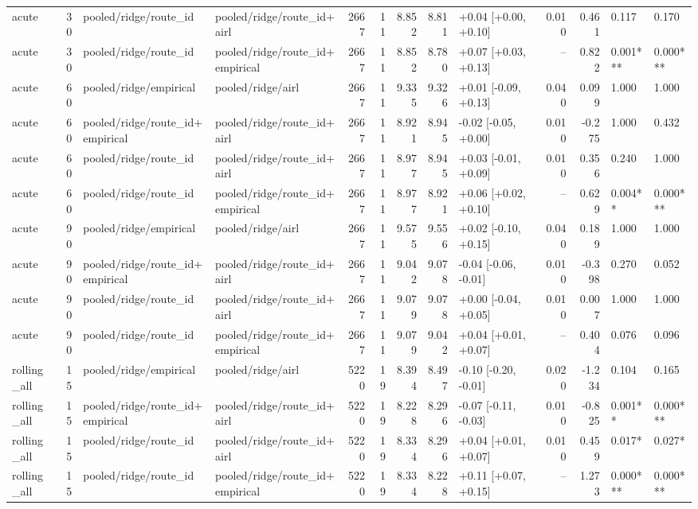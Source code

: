 \begin{tabular}{lrllrrrrlrrll}
acute & 30 & pooled/ridge/route_id & pooled/ridge/route_id+airl & 2667 & 11 & 8.852 & 8.811 & +0.04 [+0.00, +0.10] & 0.010 & 0.461 & 0.117 & 0.170 \\
acute & 30 & pooled/ridge/route_id & pooled/ridge/route_id+empirical & 2667 & 11 & 8.852 & 8.780 & +0.07 [+0.03, +0.13] & -- & 0.822 & 0.001*** & 0.000*** \\
acute & 60 & pooled/ridge/empirical & pooled/ridge/airl & 2667 & 11 & 9.335 & 9.326 & +0.01 [-0.09, +0.13] & 0.040 & 0.099 & 1.000 & 1.000 \\
acute & 60 & pooled/ridge/route_id+empirical & pooled/ridge/route_id+airl & 2667 & 11 & 8.921 & 8.945 & -0.02 [-0.05, +0.00] & 0.010 & -0.275 & 1.000 & 0.432 \\
acute & 60 & pooled/ridge/route_id & pooled/ridge/route_id+airl & 2667 & 11 & 8.977 & 8.945 & +0.03 [-0.01, +0.09] & 0.010 & 0.356 & 0.240 & 1.000 \\
acute & 60 & pooled/ridge/route_id & pooled/ridge/route_id+empirical & 2667 & 11 & 8.977 & 8.921 & +0.06 [+0.02, +0.10] & -- & 0.629 & 0.004** & 0.000*** \\
acute & 90 & pooled/ridge/empirical & pooled/ridge/airl & 2667 & 11 & 9.575 & 9.556 & +0.02 [-0.10, +0.15] & 0.040 & 0.189 & 1.000 & 1.000 \\
acute & 90 & pooled/ridge/route_id+empirical & pooled/ridge/route_id+airl & 2667 & 11 & 9.042 & 9.078 & -0.04 [-0.06, -0.01] & 0.010 & -0.398 & 0.270 & 0.052 \\
acute & 90 & pooled/ridge/route_id & pooled/ridge/route_id+airl & 2667 & 11 & 9.079 & 9.078 & +0.00 [-0.04, +0.05] & 0.010 & 0.007 & 1.000 & 1.000 \\
acute & 90 & pooled/ridge/route_id & pooled/ridge/route_id+empirical & 2667 & 11 & 9.079 & 9.042 & +0.04 [+0.01, +0.07] & -- & 0.404 & 0.076 & 0.096 \\
rolling_all & 15 & pooled/ridge/empirical & pooled/ridge/airl & 5220 & 19 & 8.394 & 8.497 & -0.10 [-0.20, -0.01] & 0.020 & -1.234 & 0.104 & 0.165 \\
rolling_all & 15 & pooled/ridge/route_id+empirical & pooled/ridge/route_id+airl & 5220 & 19 & 8.228 & 8.296 & -0.07 [-0.11, -0.03] & 0.010 & -0.825 & 0.001** & 0.000*** \\
rolling_all & 15 & pooled/ridge/route_id & pooled/ridge/route_id+airl & 5220 & 19 & 8.334 & 8.296 & +0.04 [+0.01, +0.07] & 0.010 & 0.459 & 0.017* & 0.027* \\
rolling_all & 15 & pooled/ridge/route_id & pooled/ridge/route_id+empirical & 5220 & 19 & 8.334 & 8.228 & +0.11 [+0.07, +0.15] & -- & 1.273 & 0.000*** & 0.000*** \\

\end{tabular}
